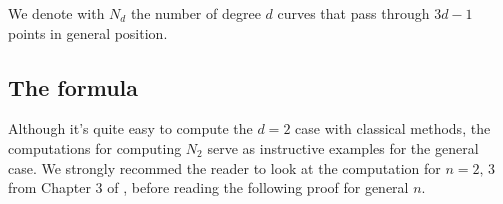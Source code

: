 \begin{definition}
    We denote with $N_{d}$ the number of degree $d$ curves that pass through $3d-1$ points in general position.
\end{definition}

\subsection{The formula}

Although it's quite easy to compute the $d = 2$ case with classical methods, the computations for computing $N_{2}$ serve as instructive examples for the general case.
We strongly recommed the reader to look at the computation for $n=2,\,3$ from Chapter $3$ of \cite{KockQcohom}, before reading the following proof for general $n$.


